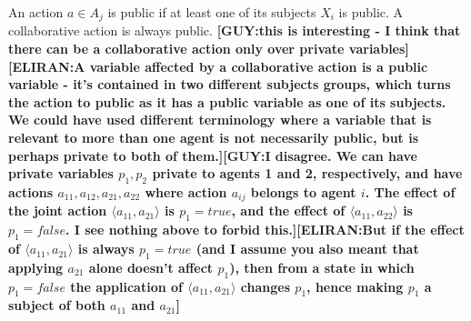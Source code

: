 \documentclass[letterpaper]{article} %
\newcommand{\eliran}[1]{\textbf{[\color{red}ELIRAN:#1]}}
\newcommand{\guy}[1]{\textbf{[\color{orange}GUY:#1]}}
\begin{document}
An action $a\in A_j$ is public if at least one of its subjects $X_i$ is public. 
A collaborative action is always public. \guy{this is interesting - I think that there can be a collaborative action only over private variables}\eliran{A variable affected by a collaborative action is a public variable - it's contained in two different subjects groups, which turns the action to public as it has a public variable as one of its subjects. We could have used different terminology where a variable that is relevant to more than one agent is not necessarily public, but is perhaps private to both of them.}\guy{I disagree. We can have private variables $p_1,p_2$ private to agents 1 and 2, respectively, and have actions $a_{11},a_{12},a_{21},a_{22}$ where action $a_{ij}$ belongs to agent $i$. The effect of the joint action $\langle a_{11},a_{21} \rangle$ is $p_1=true$, and the effect of $\langle a_{11},a_{22} \rangle$ is $p_1=false$. I see nothing above to forbid this.}\eliran{But if the effect of $\langle a_{11}, a_{21} \rangle$ is always $p_1=true$ (and I assume you also meant that applying $a_{21}$ alone doesn't affect $p_1$), then from a state in which $p_1=false$ the application of $\langle a_{11}, a_{21} \rangle$ changes $p_1$, hence making $p_1$ a subject of both $a_{11}$ and $a_{21}$}


\end{document}
